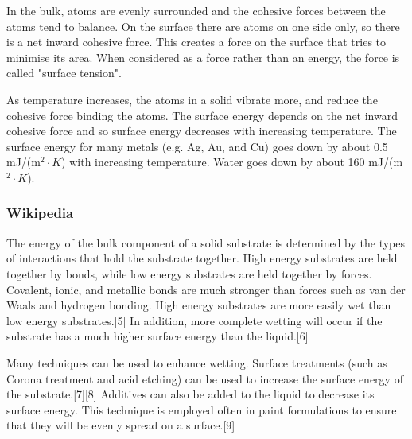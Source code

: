 In the bulk, atoms are evenly surrounded and the cohesive forces between the atoms tend to balance. On the surface there are atoms on one side only, so there is a net inward cohesive force. This creates a force on the surface that tries to minimise its area. When considered as a force rather than an energy, the force is called "surface tension".

As temperature increases, the atoms in a solid vibrate more, and reduce the cohesive force binding the atoms. The surface energy depends on the net inward cohesive force and so surface energy decreases with increasing temperature. The surface energy for many metals (e.g. Ag, Au, and Cu) goes down by about 0.5 mJ/(m$^{2}\cdot K$) with increasing temperature. Water goes down by about 160 mJ/(m$^{2}\cdot K$).

\subsubsection{\textbf{Wikipedia}}
The energy of the bulk component of a solid substrate is determined by the types of interactions that hold the substrate together. High energy substrates are held together by bonds, while low energy substrates are held together by forces. Covalent, ionic, and metallic bonds are much stronger than forces such as van der Waals and hydrogen bonding. High energy substrates are more easily wet than low energy substrates.[5] In addition, more complete wetting will occur if the substrate has a much higher surface energy than the liquid.[6]

Many techniques can be used to enhance wetting. Surface treatments (such as Corona treatment and acid etching) can be used to increase the surface energy of the substrate.[7][8] Additives can also be added to the liquid to decrease its surface energy. This technique is employed often in paint formulations to ensure that they will be evenly spread on a surface.[9]

